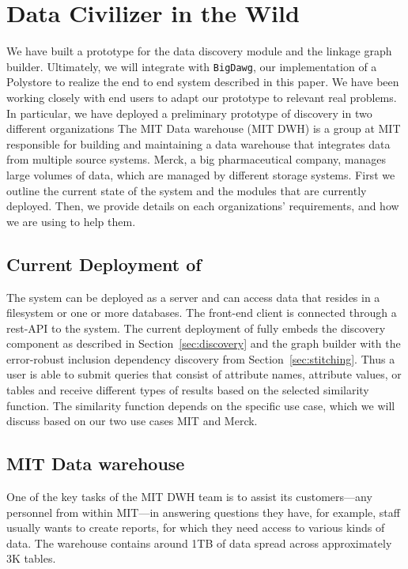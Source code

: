 \section{Data Civilizer in the Wild}
\label{sec:wild}

We have built a prototype for the data discovery module and the linkage graph builder.
Ultimately, we will integrate \dcv with \texttt{BigDawg}, our implementation of a Polystore to realize the end to end system described in this paper. 
We have been working closely with end users to adapt our prototype to relevant real problems. 
In particular, we have deployed a preliminary prototype of discovery in two different organizations 
The MIT Data warehouse (MIT DWH) is a group at MIT responsible for building and maintaining a data warehouse that integrates data from multiple source systems. Merck, a big pharmaceutical company, manages large volumes of data, which are managed by different storage systems. First we outline the current state of the system and the modules that are currently deployed.
Then, we provide details on each organizations' requirements, and how we are using \dcv to help them.

\subsection{Current Deployment of \titledcv}
The system can be deployed as a server and can access data that resides in a filesystem or one or more databases.
The front-end client is connected through a rest-API to the system.
The current deployment of \dcv fully embeds the discovery component as described in Section~\ref{sec:discovery} and the graph builder with the error-robust inclusion dependency discovery from Section~\ref{sec:stitching}. Thus a user is able to submit queries that consist of attribute names, attribute values, or tables and receive different types of results based on the selected similarity function. The similarity function depends on the specific use case, which we will discuss based on our two use cases MIT and Merck.
\subsection{MIT Data warehouse}


One of the key tasks of the MIT DWH team is to assist its customers—any personnel from within MIT—in answering questions they have, for example, staff usually wants to create reports, for which they need access to various kinds of data. The warehouse contains around 1TB of data spread across approximately 3K tables.

